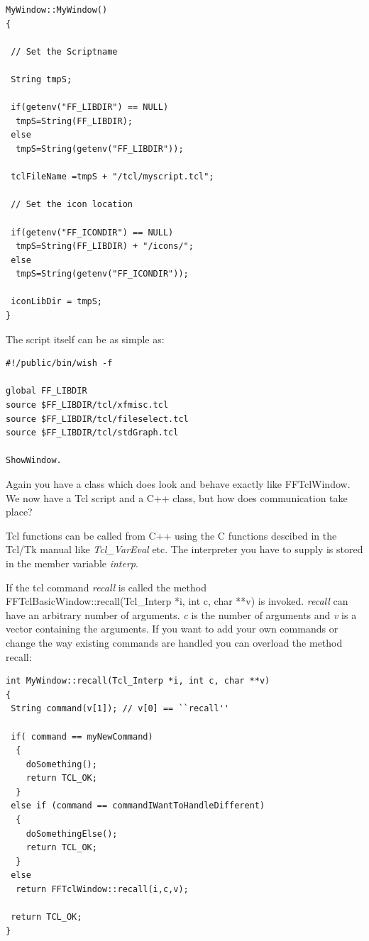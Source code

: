 \begin{verbatim}
MyWindow::MyWindow()
{

 // Set the Scriptname
 
 String tmpS;
 
 if(getenv("FF_LIBDIR") == NULL)
  tmpS=String(FF_LIBDIR);
 else
  tmpS=String(getenv("FF_LIBDIR"));
 
 tclFileName =tmpS + "/tcl/myscript.tcl";

 // Set the icon location     

 if(getenv("FF_ICONDIR") == NULL)
  tmpS=String(FF_LIBDIR) + "/icons/";
 else
  tmpS=String(getenv("FF_ICONDIR"));

 iconLibDir = tmpS;
}
\end{verbatim}

The script itself can be as simple as:

\begin{verbatim}
#!/public/bin/wish -f

global FF_LIBDIR
source $FF_LIBDIR/tcl/xfmisc.tcl
source $FF_LIBDIR/tcl/fileselect.tcl
source $FF_LIBDIR/tcl/stdGraph.tcl

ShowWindow.
\end{verbatim}


Again you have a class which does look and behave exactly like
FFTclWindow. We now have a Tcl script and a C++ class, but how does
communication take place? 

Tcl functions can be called from C++ using the C functions descibed in
the Tcl/Tk manual like {\em Tcl_VarEval} etc. The interpreter you have
to supply is stored in the member variable {\em interp}.

If the tcl command {\em recall} is called the method
{FFTclBasicWindow::recall(Tcl_Interp *i, int c, char **v)} is
invoked. {\em recall} can have an arbitrary number of arguments. {\em
c} is the number of arguments and {\em v} is a vector containing the
arguments. If you want to add your own commands or change the way
existing commands are handled you can overload the method {\en
recall}:

\begin{verbatim}
int MyWindow::recall(Tcl_Interp *i, int c, char **v)
{
 String command(v[1]); // v[0] == ``recall''

 if( command == myNewCommand)
  {
    doSomething();
    return TCL_OK;
  }
 else if (command == commandIWantToHandleDifferent)
  {
    doSomethingElse();
    return TCL_OK;
  }
 else
  return FFTclWindow::recall(i,c,v);

 return TCL_OK;
}
\end{verbatim}

